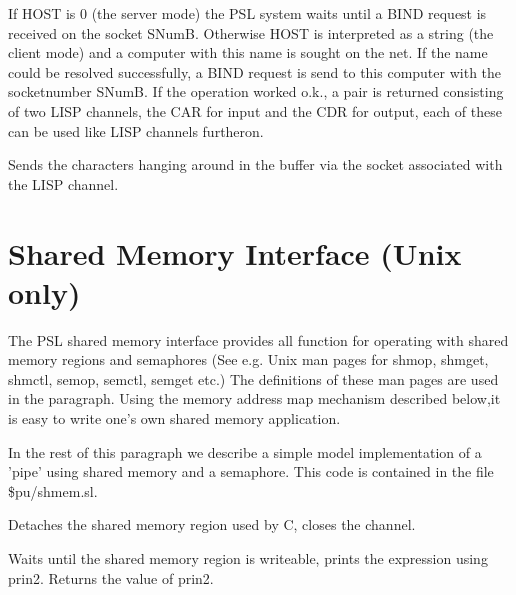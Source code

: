 {If HOST is 0 (the server mode) the PSL system waits until a BIND request
is received on the socket SNumB. Otherwise HOST is interpreted as a string
(the client mode)
and a computer with this name is sought on the net. If the name could be
resolved successfully, a BIND
request is send to this computer with the socketnumber SNumB.
If the operation worked o.k., a pair is returned consisting of
two LISP channels, the CAR for input and the CDR for output, each of these
can be used like LISP channels furtheron.}

{Sends the characters hanging around in the buffer via the socket
associated with the LISP channel.}

\section{Shared Memory Interface (Unix only)}

The PSL shared memory interface provides all function for
operating with shared memory regions and semaphores
(See e.g. Unix man pages for shmop, shmget, shmctl, semop, semctl,
semget etc.)
The definitions of these man pages are used in the paragraph.
Using the memory address map mechanism described below,it
is easy to write one's own shared memory application.

In the rest of this paragraph we describe a simple model
implementation of a 'pipe' using shared memory and a semaphore.
This code is contained in the file \$pu/shmem.sl.
\\


{Detaches the shared memory region used by C, closes the channel.}


{Waits until the shared memory region is writeable, prints the expression
using prin2. Returns the value of prin2.}


